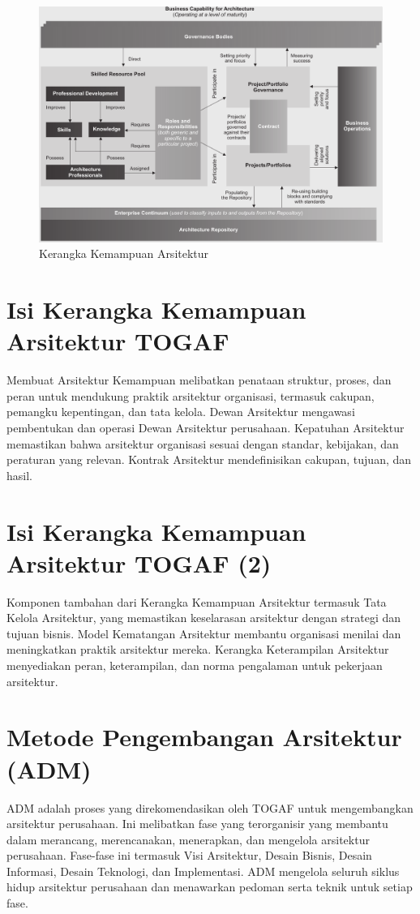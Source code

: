 \begin{figure}
	\begin{center}
		\includegraphics[width=\textwidth]{../figures/architecture_capability_framework}
		\caption{Kerangka Kemampuan Arsitektur}
	\end{center}
\end{figure}

\section{Isi Kerangka Kemampuan Arsitektur TOGAF}
Membuat Arsitektur Kemampuan melibatkan penataan struktur, proses, dan peran untuk mendukung praktik arsitektur organisasi, termasuk cakupan, pemangku kepentingan, dan tata kelola. Dewan Arsitektur mengawasi pembentukan dan operasi Dewan Arsitektur perusahaan. Kepatuhan Arsitektur memastikan bahwa arsitektur organisasi sesuai dengan standar, kebijakan, dan peraturan yang relevan. Kontrak Arsitektur mendefinisikan cakupan, tujuan, dan hasil.

\section{Isi Kerangka Kemampuan Arsitektur TOGAF (2)}
Komponen tambahan dari Kerangka Kemampuan Arsitektur termasuk Tata Kelola Arsitektur, yang memastikan keselarasan arsitektur dengan strategi dan tujuan bisnis. Model Kematangan Arsitektur membantu organisasi menilai dan meningkatkan praktik arsitektur mereka. Kerangka Keterampilan Arsitektur menyediakan peran, keterampilan, dan norma pengalaman untuk pekerjaan arsitektur.

\section{Metode Pengembangan Arsitektur (ADM)}
ADM adalah proses yang direkomendasikan oleh TOGAF untuk mengembangkan arsitektur perusahaan. Ini melibatkan fase yang terorganisir yang membantu dalam merancang, merencanakan, menerapkan, dan mengelola arsitektur perusahaan. Fase-fase ini termasuk Visi Arsitektur, Desain Bisnis, Desain Informasi, Desain Teknologi, dan Implementasi. ADM mengelola seluruh siklus hidup arsitektur perusahaan dan menawarkan pedoman serta teknik untuk setiap fase.

